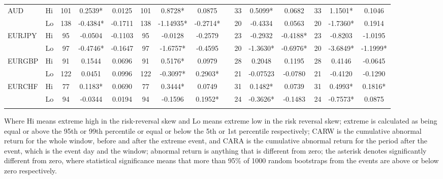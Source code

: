\documentclass[12pt, a4paper, oneside]{article} %
\begin{document}
\begin{landscape}
\begin{table}[t]
\begin{threeparttable}
\begin{tabular}{llccccccccccccc}
\multirow{2}{*}{AUD}
& Hi & 101 &0.2539* &0.0125 &101 &0.8728* & 0.0875 &  &33 &0.5099* &0.0682 &33 & 1.1501*& 0.1046  \\ 
& Lo & 138 &-0.4384* & -0.1711 & 138 & -1.14935* & -0.2714* & &20 &-0.4334 & 0.0563 &20  & -1.7360* & 0.1914  \\
\multirow{2}{*}{EURJPY}
& Hi & 95 &-0.0504 &-0.1103 &95 &-0.0128 &-0.2579 & &23 &-0.2932 &-0.4188* &23 &-0.8203 & -1.0195  \\ 
& Lo & 97 &-0.4746* & -0.1647 &97 &-1.6757* &-0.4595 & &20 &-1.3630* & -0.6976* & 20 & -3.6849* &-1.1999*  \\
\multirow{2}{*}{EURGBP}
& Hi & 91 & 0.1544 &0.0696 &91 &0.5176* &0.0979 & &28 &0.2048 &0.1195 &28 & 0.4146 & -0.0645  \\ 
& Lo & 122 & 0.0451 & 0.0996 &122 &-0.3097* &0.2903* & & 21 &-0.07523 &-0.0780 &21 & -0.4120 &
-0.1290  \\
\multirow{2}{*}{EURCHF}
& Hi & 77 & 0.1183* & 0.0690 &77 & 0.3444* & 0.0749& & 	31 & 0.1482* &0.0739  &31 & 0.4993* 
& 0.1816*  \\ 
& Lo & 94 &-0.0344 & 0.0194 & 94 & -0.1596 &0.1952* & &24 & -0.3626* &-0.1483 & 24 & -0.7573* 
& 0.0875  \\
\hline
\label{tabref:RR1}
\end{tabular}
\begin{tablenotes}
\small 
\item Where Hi means extreme high in the risk-reversal skew and Lo means extreme low in the risk reversal skew; extreme is calculated as being equal or above the 95th or 99th percentile or equal or below the 5th or 1st percentile respectively; CARW is the cumulative abnormal return for the whole window, before and after the extreme event, and CARA is the cumulative abnormal return for the period after the event, which is the event day and the window; abnormal return is anything that is different from zero; the asterisk denotes significantly different from zero, where statistical significance means that more than 95\% of 1000 random bootstraps from the events are above or below zero respectively.   
\end{tablenotes}
\end{threeparttable}  
\end{table}
\end{landscape}
\end{document}
